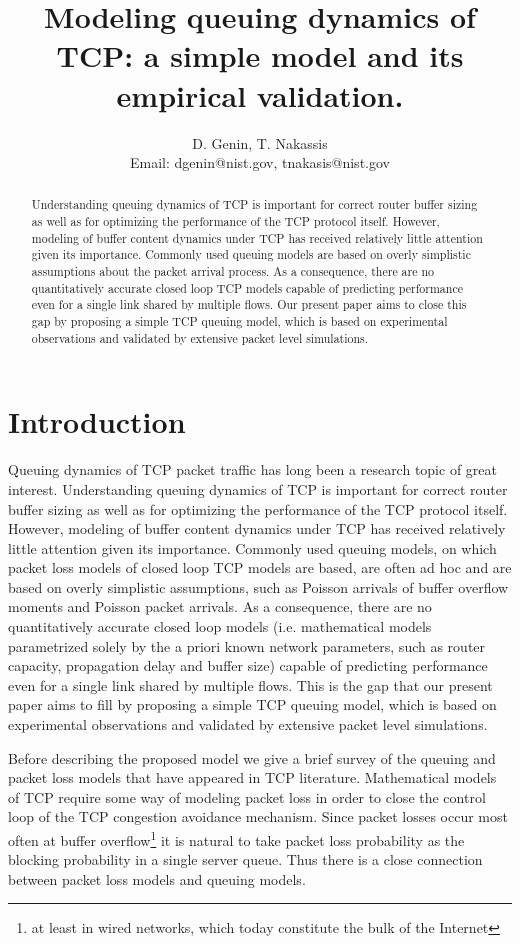 \documentclass{IEEEtran}[10pt,letterpaper,conference]
\title{Modeling queuing dynamics of TCP: a simple model and its empirical validation.}
\author{D. Genin, T. Nakassis\\Email: dgenin@nist.gov, tnakasis@nist.gov}
\begin{document}
\maketitle
\begin{abstract}
Understanding queuing dynamics of TCP is important for correct router buffer sizing as well as for optimizing the performance of the TCP protocol itself. However, modeling of buffer content dynamics under TCP has received relatively little attention given its importance. Commonly used queuing models are based on overly simplistic assumptions about the packet arrival process. As a consequence, there are no quantitatively accurate closed loop TCP models capable of predicting performance even for a single link shared by multiple flows. Our present paper aims to close this gap by proposing a simple TCP queuing model, which is based on experimental observations and validated by extensive packet level simulations.
\end{abstract}
\section{Introduction}
Queuing dynamics of TCP packet traffic has long been a research topic of great interest. Understanding queuing dynamics of TCP is important for correct router buffer sizing as well as for optimizing the performance of the TCP protocol itself. However, modeling of buffer content dynamics under TCP has received relatively little attention given its importance. Commonly used queuing models, on which packet loss models of closed loop TCP models are based, are often ad hoc and are based on overly simplistic assumptions, such as Poisson arrivals of buffer overflow moments and Poisson packet arrivals. As a consequence, there are no quantitatively accurate closed loop models (i.e. mathematical models parametrized solely by the a priori known network parameters, such as router capacity, propagation delay and buffer size) capable of predicting performance even for a single link shared by multiple flows. This is the gap that our present paper aims to fill by proposing a simple TCP queuing model, which is based on experimental observations and validated by extensive packet level simulations.

Before describing the proposed model we give a brief survey of the queuing and packet loss models that have appeared in TCP literature. Mathematical models of TCP require some way of modeling packet loss in order to close the control loop of the TCP congestion avoidance mechanism. Since packet losses occur most often at buffer overflow\footnote{at least in wired networks, which today constitute the bulk of the Internet} it is natural to take packet loss probability as the blocking probability in a single server queue. Thus there is a close connection between packet loss models and queuing models.
\end{document}
